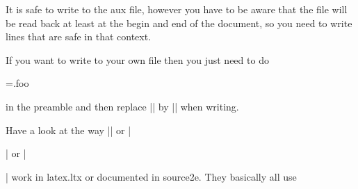 It is safe to write to the aux file, however you have to be aware that the file will be read back at least at the begin and end of the document, so you need to write lines that are safe in that context.

If you want to write to your own file then you just need to do

\begin{teXXX}
\newwrite\myfile
\immediate\openout\myfile=\jobname.foo
\end{teXXX}

in the preamble and then replace |\@auxout| by |\myfile| when writing.

Have a look at the way |\tableofcontents| or |\listoftables| or |\listoffigures| work in latex.ltx or documented in source2e. They basically all use

\begin{teXXX}
\def\@starttoc#1{%
  \begingroup
    \makeatletter
    \@input{\jobname.#1}%
    \if@filesw
      \expandafter\newwrite\csname tf@#1\endcsname
      \immediate\openout \csname tf@#1\endcsname \jobname.#1\relax
    \fi
    \@nobreakfalse
  \endgroup}
\end{teXXX}
































